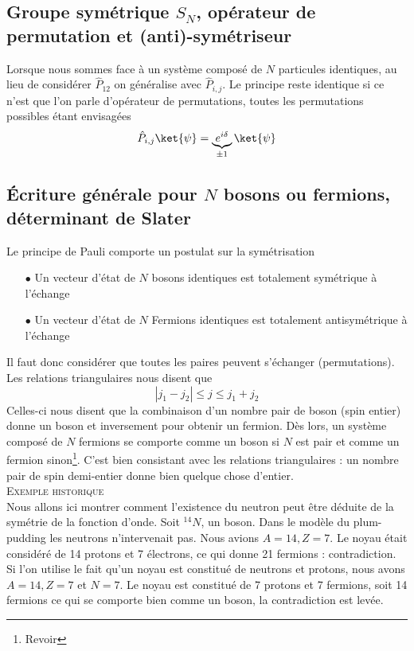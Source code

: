 \subsection{Groupe symétrique $S_N$, opérateur de permutation et (anti)-symétriseur}
Lorsque nous sommes face à un système composé de $N$ particules identiques, au lieu de considérer $\hat{P}_{12}$ 
on généralise avec $\hat{P}_{i,j}$. Le principe reste identique si ce n'est que l'on parle d'opérateur de 
permutations, toutes les permutations possibles étant envisagées
\begin{equation}
\hat{P}_{i,j} \ket{\psi} = \underbrace{e^{i\delta}}_{\pm 1}\ket{\psi}
\end{equation}

\subsection{Écriture générale pour $N$ bosons ou fermions, déterminant de Slater}
Le principe de Pauli comporte un postulat sur la symétrisation 
\begin{itemize}
\item[$\bullet$] Un vecteur d'état de $N$ bosons identiques est totalement symétrique à l'échange
\item[$\bullet$] Un vecteur d'état de $N$ Fermions identiques est totalement antisymétrique à l'échange
\end{itemize}
Il faut donc considérer que toutes les paires peuvent s'échanger (permutations). Les relations triangulaires 
nous disent que
\begin{equation}
|j_1-j_2|\leq j \leq j_1+j_2
\end{equation}
Celles-ci nous disent que la combinaison d'un nombre pair de boson (spin entier) donne un boson et inversement 
pour obtenir un fermion. Dès lors, un système composé de $N$ fermions se comporte comme un boson si $N$ est 
pair et comme un fermion sinon\footnote{Revoir}. C'est bien consistant avec les relations triangulaires : un nombre pair de spin 
demi-entier donne bien quelque chose d'entier.\\


\textsc{Exemple historique}\\
Nous allons ici montrer comment l'existence du neutron peut être déduite de la symétrie de la fonction d'onde.
Soit $^{14}N$, un boson. Dans le modèle du plum-pudding les neutrons n'intervenait pas. Nous avions $A=14, Z=7$. Le
noyau était considéré de 14 protons et 7 électrons, ce qui donne 21 fermions : contradiction. Si l'on utilise le 
fait qu'un noyau est constitué de neutrons et protons, nous avons $A=14,Z=7$ et $N=7$. Le noyau est constitué de 
7 protons et 7 fermions, soit 14 fermions ce qui se comporte bien comme un boson, la contradiction est levée.\\


